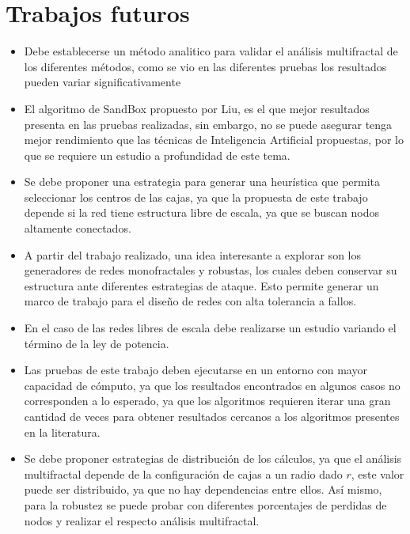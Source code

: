 \newpage
\section{Trabajos futuros}

\begin{itemize}
    \item Debe establecerse un método analitico para validar el análisis multifractal de los diferentes métodos, como se vio en las diferentes pruebas los resultados pueden variar significativamente
    \item El algoritmo de SandBox propuesto por Liu\cite{Liu2015}, es el que mejor resultados presenta en las pruebas realizadas, sin embargo, no se puede asegurar tenga mejor rendimiento que las técnicas de Inteligencia Artificial propuestas, por lo que se requiere un estudio a profundidad de este tema.
    \item Se debe proponer una estrategia para generar una heurística que permita seleccionar los centros de las cajas, ya que la propuesta de este trabajo depende si la red tiene estructura libre de escala, ya que se buscan nodos altamente conectados.
    \item A partir del trabajo realizado, una idea interesante a explorar son los generadores de redes monofractales y robustas, los cuales deben conservar su estructura ante diferentes estrategias de ataque. Esto permite generar un marco de trabajo para el diseño de redes con alta tolerancia a fallos.
    \item En el caso de las redes libres de escala debe realizarse un estudio variando el término de la ley de potencia.
    \item Las pruebas de este trabajo deben ejecutarse en un entorno con mayor capacidad de cómputo, ya que los resultados encontrados en algunos casos no corresponden a lo esperado, ya que los algoritmos requieren iterar una gran cantidad de veces para obtener resultados cercanos a los algoritmos presentes en la literatura.
    \item Se debe proponer estrategias de distribución de los cálculos, ya que el análisis multifractal depende de la configuración de cajas a un radio dado $r$, este valor puede ser distribuido, ya que no hay dependencias entre ellos. Así mismo, para la robustez se puede probar con diferentes porcentajes de perdidas de nodos y realizar el respecto análisis multifractal.
\end{itemize}
